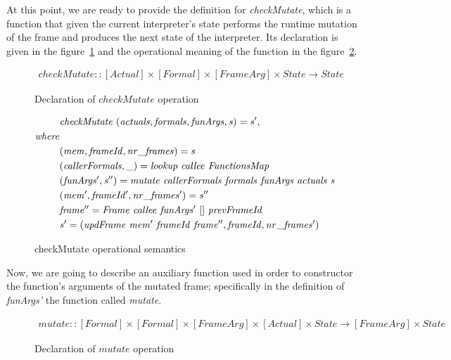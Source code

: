 \documentclass[diploma]{softlab-thesis}
\begin{document}
At this point, we are ready to provide the definition for \textit{checkMutate}, which 
is a function that given the current interpreter's state performs the runtime mutation 
of the frame and produces the next state of the interpreter. Its declaration is given in 
the figure~\ref{fig:checkdecl} and the operational meaning of the function in the 
figure~\ref{fig:checkMutate}.

\begin{figure}[h]
  \begin{align*}
    \mathit{checkMutate :: [Actual] \times [Formal] \times [FrameArg] \times State \rightarrow State} 
  \end{align*}
\caption{Declaration of $\mathit{checkMutate}$ operation\label{fig:checkdecl}}
\end{figure}

 

\begin{figure}[h]
  \begin{align*}
    & \mathit{checkMutate \hfill\ (actuals, formals, funArgs, s) = s', } \\
    \mathit{where } \\
    & \mathit{(mem, frameId, nr\_frames) = s} \\
    & \mathit{(callerFormals, \_) = lookup \hfill\ callee \hfill\ FunctionsMap} \\
    & \mathit{(funArgs', s'') = mutate \hfill\ callerFormals \hfill\ formals \hfill\ funArgs \hfill\ actuals \hfill\ s } \\
    & \mathit{(mem', frameId', nr\_frames') = s''} \\
    & \mathit{frame'' = Frame \hfill\ callee \hfill\ funArgs' \hfill\ [] \hfill\ prevFrameId} \\
    & \mathit{s' = (updFrame \hfill\ mem' \hfill\ frameId \hfill\ frame'', frameId, nr\_frames')}
  \end{align*}
\caption{checkMutate operational semantics\label{fig:checkMutate}}
\end{figure}

Now, we are going to describe an auxiliary function used in order to constructor 
the function's arguments of the mutated frame; specifically in the definition of 
\textit{funArgs'} the function called \textit{mutate}.


\begin{figure}[h]
  \begin{align*}
    \mathit{mutate :: [Formal] \times [Formal] \times [FrameArg] \times [Actual] \times State \rightarrow [FrameArg] \times State} 
  \end{align*}
\caption{Declaration of $\mathit{mutate}$ operation\label{fig:mutatedecl}}
\end{figure}
\end{document}
